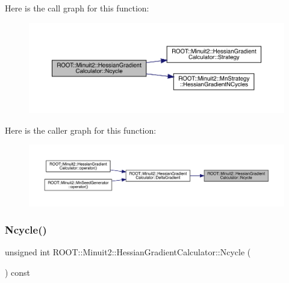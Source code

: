 Here is the call graph for this function\+:
\nopagebreak
\begin{figure}[H]
\begin{center}
\leavevmode
\includegraphics[width=350pt]{dc/d17/classROOT_1_1Minuit2_1_1HessianGradientCalculator_a234641f72296f007b2d95b514be07138_cgraph}
\end{center}
\end{figure}
Here is the caller graph for this function\+:
\nopagebreak
\begin{figure}[H]
\begin{center}
\leavevmode
\includegraphics[width=350pt]{dc/d17/classROOT_1_1Minuit2_1_1HessianGradientCalculator_a234641f72296f007b2d95b514be07138_icgraph}
\end{center}
\end{figure}
\mbox{\label{classROOT_1_1Minuit2_1_1HessianGradientCalculator_a234641f72296f007b2d95b514be07138}} 
\subsubsection{\texorpdfstring{Ncycle()}{Ncycle()}\hspace{0.1cm}{\footnotesize\ttfamily [2/3]}}
{\footnotesize\ttfamily unsigned int R\+O\+O\+T\+::\+Minuit2\+::\+Hessian\+Gradient\+Calculator\+::\+Ncycle (\begin{DoxyParamCaption}{ }\end{DoxyParamCaption}) const}

